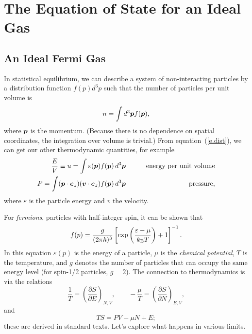 \chapter[Equation of State]{The Equation of State for an Ideal Gas}

\section{An Ideal Fermi Gas}
In statistical equilibrium, we can describe a system of non-interacting particles by a distribution function $f(p)d^{3}p$ such that the number of particles per unit volume is
\begin{equation}\label{e.dist}
n = \int d^{3}\boldsymbol{p} f(\boldsymbol{p}),
\end{equation}
where $\boldsymbol{p}$ is the momentum. (Because there is no dependence on spatial coordinates, the integration over volume is trivial.) From equation~(\ref{e.dist}), we can get our other thermodynamic quantities, for example
\begin{eqnarray}
\frac{E}{V} \equiv u = \int  \varepsilon(\boldsymbol{p}) f(\boldsymbol{p})\,d^{3}\boldsymbol{p} &\qquad& \textrm{energy per unit volume}\label{e.u}\\
P = \int  (\boldsymbol{p}\cdot\boldsymbol{e}_{z})(\boldsymbol{v}\cdot\boldsymbol{e}_{z}) f(\boldsymbol{p})\,d^{3}\boldsymbol{p} &\qquad& \textrm{pressure},\label{e.P}
\end{eqnarray}
where $\varepsilon$ is the particle energy and $v$ the velocity.

For \emph{fermions}, particles with half-integer spin, it can be shown that
\begin{equation}\label{e.fermion}
f(p) = \frac{g}{(2\pi\hbar)^{3}} \left[\exp\left(\frac{\varepsilon-\mu}{k_\mathrm{B} T}\right)+1\right]^{-1}.
\end{equation}
In this equation $\varepsilon(p)$ is the energy of a particle, $\mu$ is the \emph{chemical potential}, $T$ is the temperature, and $g$ denotes the number of particles that can occupy the same energy level (for spin-1/2 particles, $g=2$).  The connection to thermodynamics is via the relations
\[
\frac{1}{T} = \left(\frac{\partial S}{\partial E}\right)_{N,V},\qquad -\frac{\mu}{T} = \left(\frac{\partial S}{\partial N}\right)_{E,V},
\]
and 
\[
TS = PV - \mu N + E;
\]
these are derived in standard texts. Let's explore what happens in various limits.  

